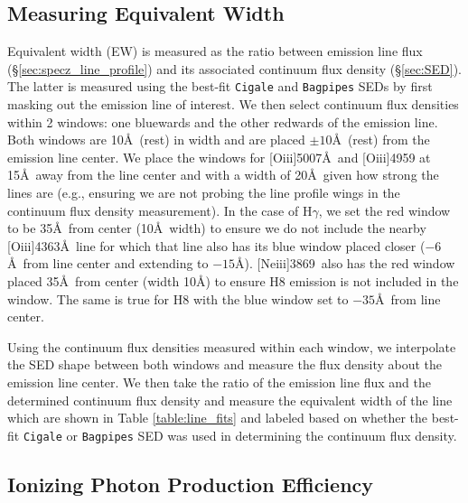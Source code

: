 \documentclass[twocolumn,tight,times,linenumbers]{aastex631}
\newcommand{\hgamma}{H$\gamma$}
\newcommand{\oiii}{[O{\sc iii}]}
\newcommand{\neiii}{[Ne{\sc iii}]}
\begin{document}
	\subsection{Measuring Equivalent Width}
	\label{sec:measure_ew}
	Equivalent width (EW) is measured as the ratio between emission line flux (\S\ref{sec:specz_line_profile}) and its associated continuum flux density (\S\ref{sec:SED}). The latter is measured using the best-fit \texttt{Cigale} and \texttt{Bagpipes} SEDs by first masking out the emission line of interest. We then select continuum flux densities within 2 windows: one bluewards and the other redwards of the emission line. Both windows are 10\AA~(rest) in width and are placed $\pm10$\AA~(rest) from the emission line center. We place the windows for \oiii5007\AA~and \oiii4959 at 15\AA~away from the line center and with a width of 20\AA~given how strong the lines are (e.g., ensuring we are not probing the line profile wings in the continuum flux density measurement).  In the case of \hgamma, we set the red window to be 35\AA~from center (10\AA~width) to ensure we do not include the nearby \oiii4363\AA~line for which that line also has its blue window placed closer ($-6$\AA~from line center and extending to $-15$\AA). \neiii3869~also has the red window placed 35\AA~from center (width 10\AA) to ensure H8 emission is not included in the window. The same is true for H8 with the blue window set to $-35$\AA~from line center.
	
	Using the continuum flux densities measured within each window, we interpolate the SED shape between both windows and measure the flux density about the emission line center. We then take the ratio of the emission line flux and the determined continuum flux density and measure the equivalent width of the line which are shown in Table \ref{table:line_fits} and labeled based on whether the best-fit \texttt{Cigale} or \texttt{Bagpipes} SED was used in determining the continuum flux density.
	
	\subsection{Ionizing Photon Production Efficiency}
	\label{sec:xi_ion}
	
\end{document}
